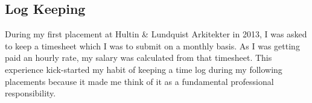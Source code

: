 \subsection{Log Keeping}

During my first placement at Hultin \& Lundquist Arkitekter in 2013, I was asked to keep a timesheet which I was to submit on a monthly basis.
As I was getting paid an hourly rate, my salary was calculated from that timesheet.
This experience kick-started my habit of keeping a time log during my following placements because it made me think of it as a fundamental professional responsibility.

